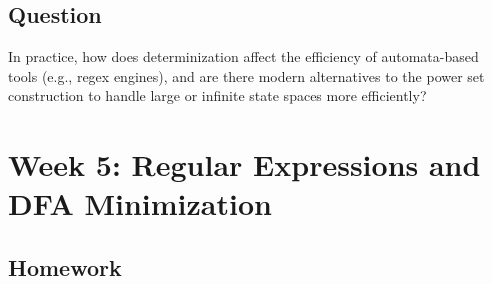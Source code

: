 \documentclass[11pt]{article}
\begin{document}
\subsection{Question}

In practice, how does determinization affect the efficiency of automata-based tools (e.g., regex engines), and are there modern alternatives to the power set construction to handle large or infinite state spaces more efficiently?

\section{Week 5: Regular Expressions and DFA Minimization}

\subsection{Homework}
\end{document}
